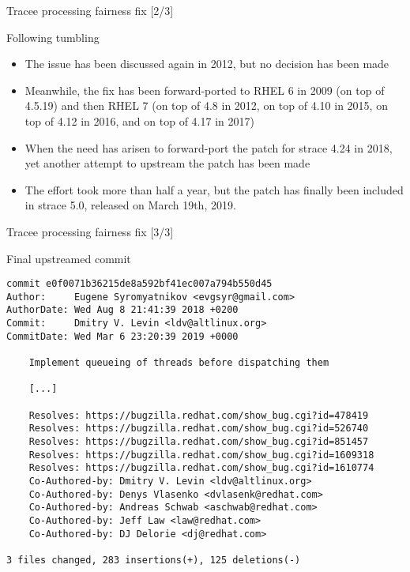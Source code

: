 \documentclass[unicode]{beamer}
\begin{document}

\begin{frame}{Tracee processing fairness fix \hfill [2/3]}
\begin{block}{\large Following tumbling}
\begin{itemize}
  \item The issue has been discussed again in 2012\footnotemark[1],
        but no decision has been made
  \item Meanwhile, the fix has been forward-ported to RHEL 6
        in 2009 (on top of 4.5.19) and then RHEL 7 (on top of 4.8 in 2012,
        on top of 4.10 in 2015, on top of 4.12 in 2016, and on top of 4.17
        in 2017)
  \item When the need has arisen to forward-port the patch for strace 4.24
        in 2018, yet another attempt to upstream the patch has been made
  \item The effort took more than half a year, but the patch has finally
        been included in strace 5.0, released on March 19th, 2019.
\end{itemize}
\end{block}
\end{frame}

\begin{frame}[fragile]{Tracee processing fairness fix \hfill [3/3]}
\begin{block}{\large Final upstreamed commit}
\begin{scriptsize}
\begin{verbatim}
commit e0f0071b36215de8a592bf41ec007a794b550d45
Author:     Eugene Syromyatnikov <evgsyr@gmail.com>
AuthorDate: Wed Aug 8 21:41:39 2018 +0200
Commit:     Dmitry V. Levin <ldv@altlinux.org>
CommitDate: Wed Mar 6 23:20:39 2019 +0000

    Implement queueing of threads before dispatching them
    
    [...]
    
    Resolves: https://bugzilla.redhat.com/show_bug.cgi?id=478419
    Resolves: https://bugzilla.redhat.com/show_bug.cgi?id=526740
    Resolves: https://bugzilla.redhat.com/show_bug.cgi?id=851457
    Resolves: https://bugzilla.redhat.com/show_bug.cgi?id=1609318
    Resolves: https://bugzilla.redhat.com/show_bug.cgi?id=1610774
    Co-Authored-by: Dmitry V. Levin <ldv@altlinux.org>
    Co-Authored-by: Denys Vlasenko <dvlasenk@redhat.com>
    Co-Authored-by: Andreas Schwab <aschwab@redhat.com>
    Co-Authored-by: Jeff Law <law@redhat.com>
    Co-Authored-by: DJ Delorie <dj@redhat.com>

3 files changed, 283 insertions(+), 125 deletions(-)
\end{verbatim}
\end{scriptsize}
\end{block}
\end{frame}
\end{document}
